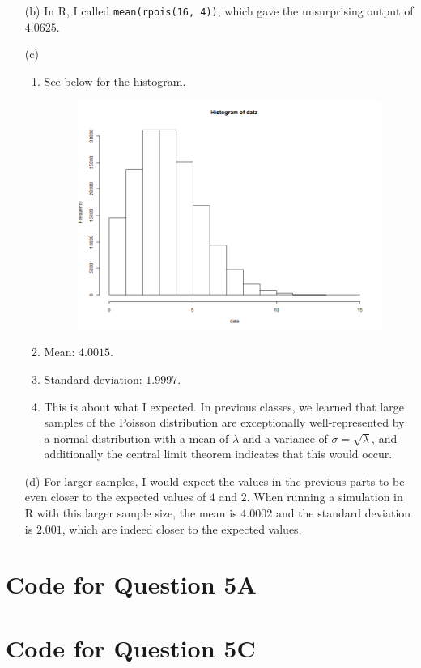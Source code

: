 \documentclass{article}
\begin{document}
\begin{enumerate}
\begin{enumerate}
\begin{figure}[h]
        \end{figure}
    \item [(b)] In R, I called \texttt{mean(rpois(16, 4))}, which gave the unsurprising output of $4.0625$.
    \item [(c)]
        \begin{enumerate}
        \item See below for the histogram.
        \begin{figure}[h]
        \centering
            \includegraphics[width=\textwidth]{sta248-a1-q5-c}
        \end{figure}
        \item Mean: $4.0015$.
        \item Standard deviation: $1.9997$.
        \item This is about what I expected. In previous classes, we learned that large samples of the Poisson distribution are exceptionally well-represented by a normal distribution with a mean of $\lambda$ and a variance of $\sigma = \sqrt{\lambda}$, and additionally the central limit theorem indicates that this would occur.
        \end{enumerate}
    \item [(d)] For larger samples, I would expect the values in the previous parts to be even closer to the expected values of $4$ and $2$. When running a simulation in R with this larger sample size, the mean is $4.0002$ and the standard deviation is $2.001$, which are indeed closer to the expected values.
    \end{enumerate}
\end{enumerate}

\newpage
\appendix
\section{Code for Question 5A}

\section{Code for Question 5C}

\end{document}
